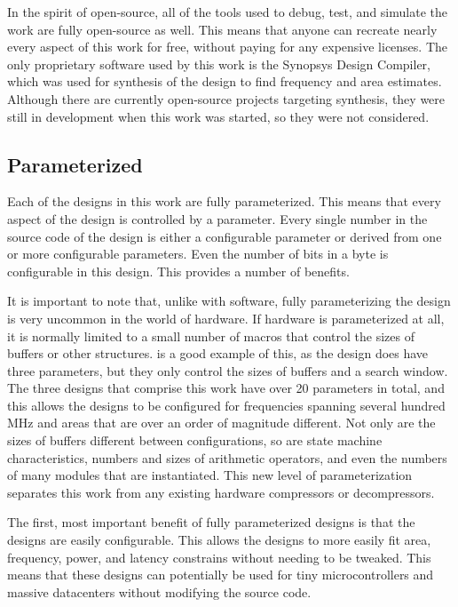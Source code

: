 \documentclass[doublespace,nopageskip]{VTthesis}
\begin{document}
In the spirit of open-source, all of the tools used to debug, test, and simulate the work are fully open-source as well. This means that anyone can recreate nearly every aspect of this work for free, without paying for any expensive licenses. The only proprietary software used by this work is the Synopsys Design Compiler, which was used for synthesis of the design to find frequency and area estimates. Although there are currently open-source projects targeting synthesis, they were still in development when this work was started, so they were not considered.

\subsection{Parameterized}\label{ss:parameterized}
Each of the designs in this work are fully parameterized. This means that every aspect of the design is controlled by a parameter. Every single number in the source code of the design is either a configurable parameter or derived from one or more configurable parameters. Even the number of bits in a byte is configurable in this design. This provides a number of benefits.

It is important to note that, unlike with software, fully parameterizing the design is very uncommon in the world of hardware. If hardware is parameterized at all, it is normally limited to a small number of macros that control the sizes of buffers or other structures. \cite{hdldeflate} is a good example of this, as the design does have three parameters, but they only control the sizes of buffers and a search window. The three designs that comprise this work have over 20 parameters in total, and this allows the designs to be configured for frequencies spanning several hundred MHz and areas that are over an order of magnitude different. Not only are the sizes of buffers different between configurations, so are state machine characteristics, numbers and sizes of arithmetic operators, and even the numbers of many modules that are instantiated. This new level of parameterization separates this work from any existing hardware compressors or decompressors.

The first, most important benefit of fully parameterized designs is that the designs are easily configurable. This allows the designs to more easily fit area, frequency, power, and latency constrains without needing to be tweaked. This means that these designs can potentially be used for tiny microcontrollers and massive datacenters without modifying the source code.
\end{document}
